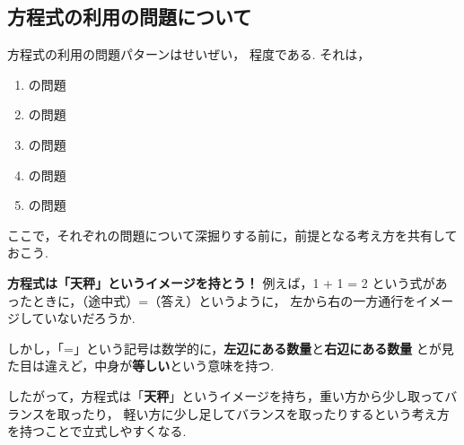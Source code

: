\subsection{方程式の利用の問題について}
方程式の利用の問題パターンはせいぜい， \fitblankbf[5パターン]{} 程度である.
それは，

\begin{enumerate}
    \item \fitblankbf[個数と代金]{} の問題
    \item \fitblankbf[道のり・速さ・時間]{} の問題
    \item \fitblankbf[割合]{} の問題
    \item \fitblankbf[過不足]{} の問題
    \item \fitblankbf[整数]{} の問題
\end{enumerate}

ここで，それぞれの問題について深掘りする前に，前提となる考え方を共有しておこう.
\vspace{2em}

\begin{techniquebox}[tech:01]{\textbf{方程式は「\textbf{天秤}」というイメージを持とう！}}
    例えば，1 + 1 = 2 という式があったときに，（途中式）=（答え）というように，
    左から右の一方通行をイメージしていないだろうか.

    しかし，「=」という記号は数学的に，\textbf{左辺にある数量}と\textbf{右辺にある数量}
    とが見た目は違えど，中身が\textbf{等しい}という意味を持つ.

    したがって，方程式は「\textbf{天秤}」というイメージを持ち，重い方から少し取ってバランスを取ったり，
    軽い方に少し足してバランスを取ったりするという考え方を持つことで立式しやすくなる.
\end{techniquebox}
\newpage
